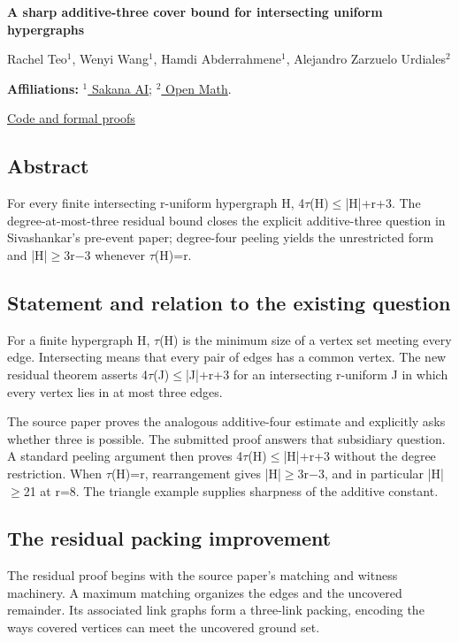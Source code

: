 \documentclass[11pt,a4paper]{article}
\begin{document}
{\LARGE\bfseries A sharp additive-three cover bound for intersecting uniform hypergraphs\par}\medskip
{\small Rachel Teo\ensuremath{^1}, Wenyi Wang\ensuremath{^1}, Hamdi Abderrahmene\ensuremath{^1}, Alejandro Zarzuelo Urdiales\ensuremath{^2}\par}\medskip
{\small\textbf{Affiliations:} \href{https://sakana.ai/}{\ensuremath{^1} Sakana AI}; \href{https://rsihouse.ai/openmath}{\ensuremath{^2} Open Math}.\par}

{\small\href{https://github.com/alejandrozu/openmath-2026-judging}{Code and formal proofs}\par}

\subsection{Abstract}
For every finite intersecting r-uniform hypergraph H, 4\ensuremath{\tau}(H)\ensuremath{\leq}|H|+r+3. The degree-at-most-three residual bound closes the explicit additive-three question in Sivashankar's pre-event paper; degree-four peeling yields the unrestricted form and |H|\ensuremath{\geq}3r\ensuremath{-}3 whenever \ensuremath{\tau}(H)=r.

\subsection{Statement and relation to the existing question}
For a finite hypergraph H, \ensuremath{\tau}(H) is the minimum size of a vertex set meeting every edge. Intersecting means that every pair of edges has a common vertex. The new residual theorem asserts 4\ensuremath{\tau}(J)\ensuremath{\leq}|J|+r+3 for an intersecting r-uniform J in which every vertex lies in at most three edges.

The source paper proves the analogous additive-four estimate and explicitly asks whether three is possible. The submitted proof answers that subsidiary question. A standard peeling argument then proves 4\ensuremath{\tau}(H)\ensuremath{\leq}|H|+r+3 without the degree restriction. When \ensuremath{\tau}(H)=r, rearrangement gives |H|\ensuremath{\geq}3r\ensuremath{-}3, and in particular |H|\ensuremath{\geq}21 at r=8. The triangle example supplies sharpness of the additive constant.

\subsection{The residual packing improvement}
The residual proof begins with the source paper's matching and witness machinery. A maximum matching organizes the edges and the uncovered remainder. Its associated link graphs form a three-link packing, encoding the ways covered vertices can meet the uncovered ground set.
\end{document}
